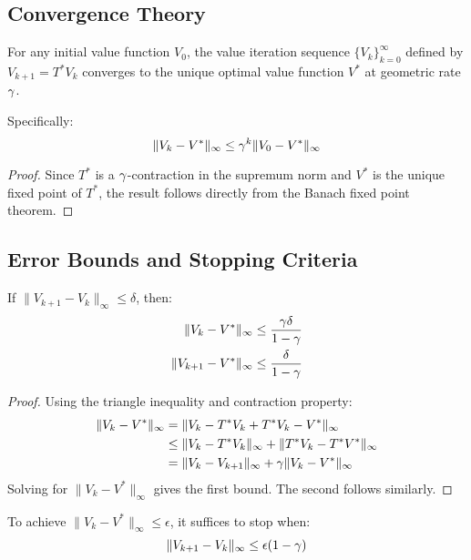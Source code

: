 \subsection{Convergence Theory}

\begin{theorem}
For any initial value function $V_0$, the value iteration sequence $\{V_k\}_{k=0}^\infty$ defined by $V_{k+1} = T^* V_k$ converges to the unique optimal value function $V^*$ at geometric rate $\gamma$.

Specifically:
\begin{equation}
\|V_k - V^*\|_\infty \leq \gamma^k \|V_0 - V^*\|_\infty
\end{equation}
\end{theorem}

\begin{proof}
Since $T^*$ is a $\gamma$-contraction in the supremum norm and $V^*$ is the unique fixed point of $T^*$, the result follows directly from the Banach fixed point theorem.
\end{proof}

\subsection{Error Bounds and Stopping Criteria}

\begin{theorem}
If $\|V_{k+1} - V_k\|_\infty \leq \delta$, then:
\begin{align}
\|V_k - V^*\|_\infty &\leq \frac{\gamma \delta}{1 - \gamma} \\
\|V_{k+1} - V^*\|_\infty &\leq \frac{\delta}{1 - \gamma}
\end{align}
\end{theorem}

\begin{proof}
Using the triangle inequality and contraction property:
\begin{align}
\|V_k - V^*\|_\infty &= \|V_k - T^* V_k + T^* V_k - V^*\|_\infty \\
&\leq \|V_k - T^* V_k\|_\infty + \|T^* V_k - T^* V^*\|_\infty \\
&= \|V_k - V_{k+1}\|_\infty + \gamma \|V_k - V^*\|_\infty
\end{align}
Solving for $\|V_k - V^*\|_\infty$ gives the first bound. The second follows similarly.
\end{proof}

\begin{corollary}
To achieve $\|V_k - V^*\|_\infty \leq \epsilon$, it suffices to stop when:
\begin{equation}
\|V_{k+1} - V_k\|_\infty \leq \epsilon(1 - \gamma)
\end{equation}
\end{corollary}

